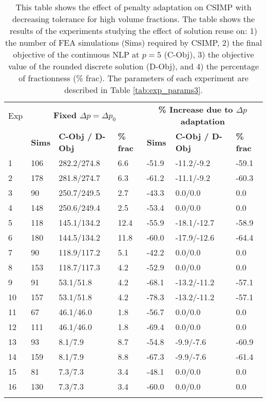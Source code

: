 \begin{table}
\centering
\tabcolsep=0.09cm
\caption{This table shows the effect of penalty adaptation on CSIMP with decreasing tolerance for high volume fractions. The table shows the results of the experiments studying the effect of solution reuse on: 1) the number of FEA simulations (Sims) required by CSIMP, 2) the final objective of the continuous NLP at $p = 5$ (C-Obj), 3) the objective value of the rounded discrete solution (D-Obj), and 4) the percentage of fractionness (\% frac). The parameters of each experiment are described in Table \ref{tab:exp_params3}.}
\label{tab:dec_tol_csimp_reuse2}
\begin{tabular}{|l|l|l|l|l||l|l|}
\hline\noalign{\smallskip}
Exp & \multicolumn{3}{c||}{\textbf{Fixed $\Delta p = \Delta p_0$}} & \multicolumn{3}{c|}{\textbf{\% Increase due to $\Delta p$ adaptation}} \\
\noalign{\smallskip}\hline\noalign{\smallskip}
& \textbf{Sims} & \textbf{C-Obj / D-Obj} & \textbf{\% frac} & \textbf{Sims} & \textbf{C-Obj / D-Obj} & \textbf{\% frac}\\
\hline
1 & 106 & 282.2/274.8 & 6.6 & -51.9 & -11.2/-9.2 & -59.1 \\ 
\hline
2 &  178 & 281.8/274.7 & 6.3 & -61.2 & -11.1/-9.2 & -60.3 \\ 
\hline
3 &  90 & 250.7/249.5 & 2.7 & -43.3 & 0.0/0.0 & 0.0 \\ 
\hline
4 &  148 & 250.6/249.4 & 2.5 & -53.4 & 0.0/0.0 & 0.0 \\ 
\hline
\hline
5 & 118 & 145.1/134.2 & 12.4 & -55.9 & -18.1/-12.7 & -58.9 \\ 
\hline
6 & 180 & 144.5/134.2 & 11.8 & -60.0 & -17.9/-12.6 & -64.4 \\ 
\hline
7 & 90 & 118.9/117.2 & 5.1 & -42.2 & 0.0/0.0 & 0.0 \\ 
\hline
8 & 153 & 118.7/117.3 & 4.2 & -52.9 & 0.0/0.0 & 0.0 \\ 
\hline
\hline
9 & 91 & 53.1/51.8 & 4.2 & -68.1 & -13.2/-11.2 & -57.1 \\ 
\hline
10 & 157 & 53.1/51.8 & 4.2 & -78.3 & -13.2/-11.2 & -57.1 \\ 
\hline
11 & 67 & 46.1/46.0 & 1.8 & -56.7 & 0.0/0.0 & 0.0 \\ 
\hline
12 & 111 & 46.1/46.0 & 1.8 & -69.4 & 0.0/0.0 & 0.0 \\ 
\hline
\hline
13 & 93 & 8.1/7.9 & 8.7 & -54.8 & -9.9/-7.6 & -60.9 \\ 
\hline
14 & 159 & 8.1/7.9 & 8.8 & -67.3 & -9.9/-7.6 & -61.4 \\ 
\hline
15 & 81 & 7.3/7.3 & 3.4 & -48.1 & 0.0/0.0 & 0.0 \\ 
\hline
16 & 130 & 7.3/7.3 & 3.4 & -60.0 & 0.0/0.0 & 0.0 \\ 
\hline
\noalign{\smallskip}\hline
\end{tabular}
\end{table}
